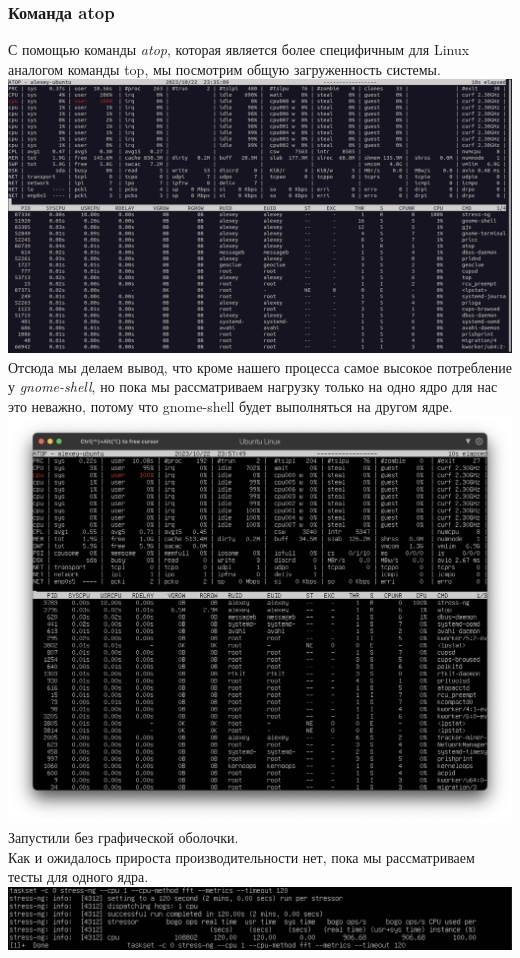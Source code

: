 \subsubsection{Команда atop}
С помощью команды \textit{atop}, которая является более специфичным для Linux аналогом команды top, мы посмотрим общую загруженность системы.\\
\includegraphics[width=\textwidth]{image/atop2.png}
Отсюда мы делаем вывод, что кроме нашего процесса самое высокое потребление у \textit{gnome-shell}, но пока мы рассматриваем нагрузку только на одно ядро для нас это неважно, потому что gnome-shell будет выполняться на другом ядре.\\
\includegraphics[width=\textwidth]{image/atop3.png}
Запустили без графической оболочки. \\
Как и ожидалось прироста производительности нет, пока мы рассматриваем тесты для одного ядра.\\
\includegraphics[width=\textwidth]{image/gnome.png}
